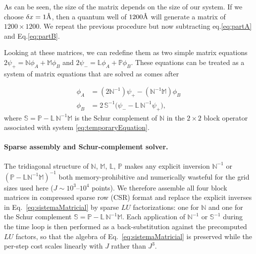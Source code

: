 As can be seen, the size of the matrix depends on the size of our system. If we choose $\delta x = 1\textup{\AA}$, then a quantum well of $1200\textup{\AA}$ will generate a matrix of $1200\times1200$. We repeat the previous procedure but now subtracting eq.\eqref{eq:partA} and Eq.\eqref{eq:partB}.

Looking at these matrices, we can redefine them as two simple matrix equations $2\psi_+=\mathbb{N}\phi_A+\mathbb{M}\phi_B$ and $2\psi_-=\mathbb{L}\phi_A+\mathbb{P}\phi_B$. These equations can be treated as a system of matrix equations that are solved as comes after

\begin{align}
    \label{eq:sistemaMatricial}
    \phi_A&=(2\mathbb{N}^{-1})\psi_+-(\mathbb{N}^{-1}\mathbb{M})\phi_B\nonumber\\
    \phi_B&=2\,\mathbb{S}^{-1}\bigl(\psi_--\mathbb{L}\,\mathbb{N}^{-1}\psi_+\bigr),
\end{align}
\noindent where $\mathbb{S}=\mathbb{P}-\mathbb{L}\,\mathbb{N}^{-1}\mathbb{M}$ is the Schur complement of $\mathbb{N}$ in the $2\times2$ block operator associated with system \eqref{eq:temporaryEquation}.

\paragraph{Sparse assembly and Schur-complement solver.}
The tridiagonal structure of $\mathbb{N}$, $\mathbb{M}$, $\mathbb{L}$, $\mathbb{P}$ makes any explicit inversion $\mathbb{N}^{-1}$ or $(\mathbb{P}-\mathbb{L}\mathbb{N}^{-1}\mathbb{M})^{-1}$ both memory-prohibitive and numerically wasteful for the grid sizes used here ($J\sim 10^{3}$--$10^{4}$ points). We therefore assemble all four block matrices in compressed sparse row (CSR) format and replace the explicit inverses in Eq.~\eqref{eq:sistemaMatricial} by sparse $LU$ factorizations: one for $\mathbb{N}$ and one for the Schur complement $\mathbb{S}=\mathbb{P}-\mathbb{L}\,\mathbb{N}^{-1}\mathbb{M}$. Each application of $\mathbb{N}^{-1}$ or $\mathbb{S}^{-1}$ during the time loop is then performed as a back-substitution against the precomputed $LU$ factors, so that the algebra of Eq.~\eqref{eq:sistemaMatricial} is preserved while the per-step cost scales linearly with $J$ rather than $J^{3}$.

